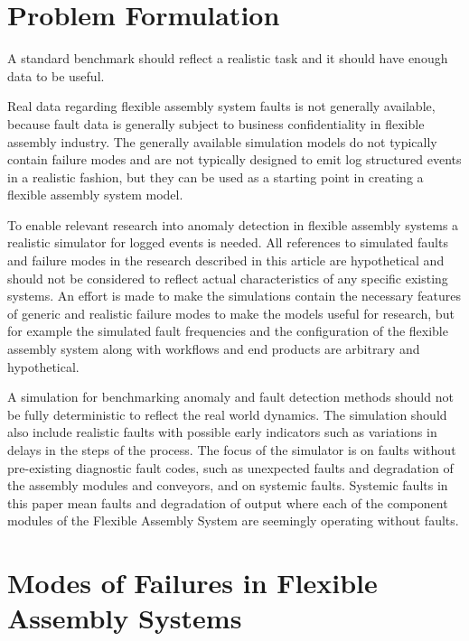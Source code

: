\documentclass[journal]{IEEEtran}
\begin{document}
\section{Problem Formulation}

A standard benchmark should reflect a realistic task and it should have enough data to be useful.

Real data regarding flexible assembly system faults is
not generally available, because fault data is generally subject to business confidentiality in flexible assembly industry.
The generally available simulation models do not typically contain failure modes and are not typically designed to emit
log structured events in a realistic fashion, but they can be used as a starting point in creating a flexible assembly system model.

To enable relevant research into anomaly detection in flexible assembly systems a realistic simulator for logged events is needed.
All references to simulated faults and failure modes in the research described in this article are hypothetical and should not be considered to
reflect actual characteristics of any specific existing systems. An effort is made to make the simulations contain the necessary features of
generic and realistic failure modes to make the models useful for research, but for example the simulated fault frequencies and the configuration
of the flexible assembly system along with workflows and end products are arbitrary and hypothetical.

A simulation for benchmarking anomaly and fault detection methods should not be fully deterministic to reflect the real world dynamics. The simulation should also
include realistic faults with possible early indicators such as variations in delays in the steps of the process. The focus of the simulator is on faults without pre-existing
diagnostic fault codes, such as unexpected faults and degradation of the assembly modules and conveyors, and on systemic faults. Systemic faults in this paper
mean faults and degradation of output where each of the component modules of the Flexible Assembly System are seemingly operating without faults.

\section{Modes of Failures in Flexible Assembly Systems}
\end{document}
